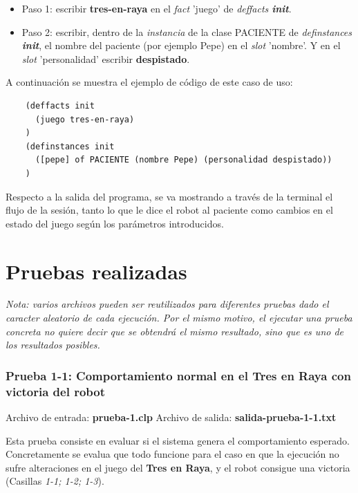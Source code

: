 \documentclass{uc3mpracticas}
\begin{document}
  \begin{itemize}
    \item Paso 1: escribir \textbf{tres-en-raya} en el \textit{fact} 'juego' de \textit{deffacts \textbf{init}}.
    \item Paso 2: escribir, dentro de la \textit{instancia} de la clase PACIENTE de \textit{definstances \textbf{init}}, el nombre del paciente (por ejemplo Pepe) en el \textit{slot} 'nombre'. Y en el \textit{slot} 'personalidad' escribir \textbf{despistado}.
  \end{itemize}


  A continuación se muestra el ejemplo de código de este caso de uso:

  \begin{lstlisting}
    (deffacts init
      (juego tres-en-raya)
    )
    (definstances init
      ([pepe] of PACIENTE (nombre Pepe) (personalidad despistado))
    )
  \end{lstlisting}

  Respecto a la salida del programa, se va mostrando a través de la terminal el flujo de la sesión, tanto lo que le dice el robot al paciente como cambios en el estado del juego según los parámetros introducidos.

  \newpage

  \section{Pruebas realizadas}

  \textit{Nota: varios archivos pueden ser reutilizados para diferentes pruebas dado el caracter aleatorio de cada ejecución. Por el mismo motivo, el ejecutar una prueba concreta no quiere decir que se obtendrá el mismo resultado, sino que es uno de los resultados posibles.}

  \subsubsection{Prueba 1-1: Comportamiento normal en el Tres en Raya con victoria del robot}


  Archivo de entrada: \textbf{prueba-1.clp} \hspace{15mm} Archivo de salida: \textbf{salida-prueba-1-1.txt}

  \vspace{2mm}

  Esta prueba consiste en evaluar si el sistema genera el comportamiento esperado. Concretamente se evalua que todo funcione para el caso en que la ejecución no sufre alteraciones en el juego del \textbf{Tres en Raya}, y el robot consigue una victoria (Casillas \textit{1-1; 1-2; 1-3}).
\end{document}
